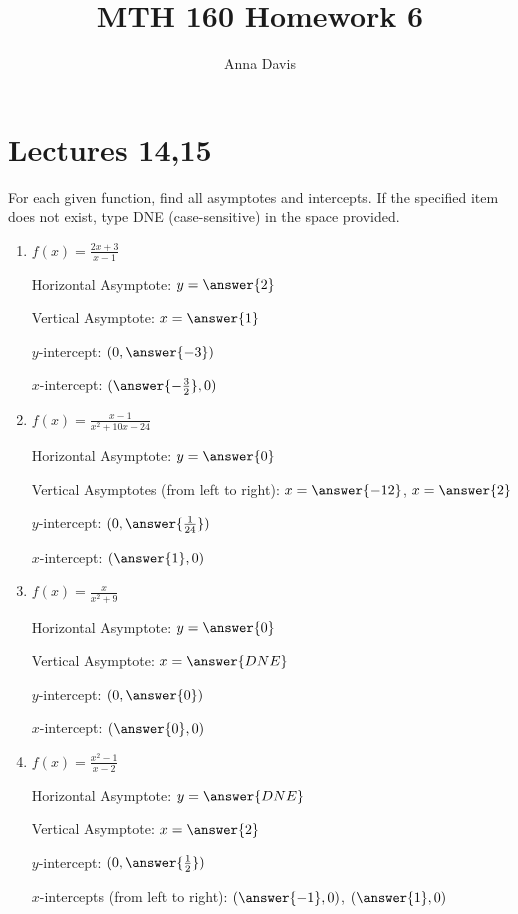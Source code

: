 \documentclass{ximera}
\author{Anna Davis} \title{MTH 160 Homework 6}
\begin{document}
\begin{abstract}

\end{abstract}
\maketitle
 \section{Lectures 14,15}
 
 \begin{problem}\label{prob:160hom6prob2} 
 For each given function, find all asymptotes and intercepts.   If the specified item does not exist, type DNE (case-sensitive) in the space provided.  
  \begin{enumerate}
\item
$f(x)=\frac{2x+3}{x-1}$

Horizontal Asymptote: $y=\answer{2}$

Vertical Asymptote: $x=\answer{1}$

$y$-intercept: $(0, \answer{-3})$

$x$-intercept: $(\answer{-\frac{3}{2}},0)$

\item
$f(x)=\frac{x-1}{x^2+10x-24}$

Horizontal Asymptote: $y=\answer{0}$

Vertical Asymptotes (from left to right): $x=\answer{-12}$, $x=\answer{2}$

$y$-intercept: $(0, \answer{\frac{1}{24}})$

$x$-intercept: $(\answer{1},0)$
\item
$f(x)=\frac{x}{x^2+9}$

Horizontal Asymptote: $y=\answer{0}$

Vertical Asymptote: $x=\answer{DNE}$

$y$-intercept: $(0, \answer{0})$

$x$-intercept: $(\answer{0},0)$

\item
$f(x)=\frac{x^2-1}{x-2}$

Horizontal Asymptote: $y=\answer{DNE}$

Vertical Asymptote: $x=\answer{2}$

$y$-intercept: $(0, \answer{\frac{1}{2}})$

$x$-intercepts (from left to right): $(\answer{-1},0)$, $(\answer{1},0)$
  \end{enumerate}
\end{problem}
 
 
\end{document}
